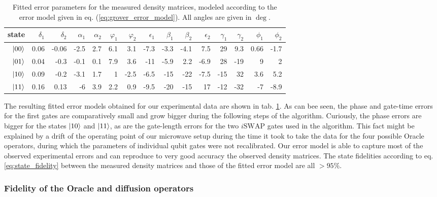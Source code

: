 \begin{table}[ht!]
\centering
\footnotesize{
\begin{tabular}{r|rrrrrrrrrrrrrr}
state & $\delta_1$ & $\delta_2$ & $\alpha_1$ & $\alpha_2$ & $\varphi_1$ & $\varphi_2$ & $\epsilon_1$ & $\beta_1$ & $\beta_2$ & $\epsilon_2$ & $\gamma_1$ & $\gamma_2$ & $\phi_1$ & $\phi_2$ \\ \hline
$\left| 00 \right>$ & 0.06 & -0.06 & -2.5 & 2.7 & 6.1 & 3.1 & -7.3 & -3.3 & -4.1 & 7.5 & 29 & 9.3 & 0.66 & -1.7
 \\
$\left| 01 \right>$ & 0.04 & -0.3 & -0.1 & 0.1 & 7.9 & 3.6 & -11 & -5.9 & 2.2 & -6.9 & 28 & -19 &  9 &  2
 \\
$\left| 10 \right>$ & 0.09 & -0.2 & -3.1 & 1.7 &  1 & -2.5 & -6.5 & -15 & -22 & -7.5 & -15 & 32 & 3.6 & 5.2
\\
$\left| 11 \right>$ & 0.16 & 0.13 & -6 & 3.9 & 2.2 & 0.9 & -9.5 & -20 & -15 & 17 & -12 & -32 & -7 & -8.9
\end{tabular}
}
\caption[Fitted gate error parameters of the Grover algorithm]{Fitted error parameters for the measured density matrices, modeled according to the error model given in eq. (\ref{eq:grover_error_model}). All angles are given in $\deg$.}
\label{tab:grover_error_parameters}
\end{table}

The resulting fitted error models obtained for our experimental data are shown in tab. \ref{tab:grover_error_parameters}. As can bee seen, the phase and gate-time errors for the first gates are comparatively small and grow bigger during the following steps of the algorithm. Curiously, the phase errors are bigger for the states $\left| 10 \right>$ and $\left| 11 \right>$, as are the gate-length errors for the two $i\mathrm{SWAP}$ gates used in the algorithm. This fact might be explained by a drift of the operating point of our microwave setup during the time it took to take the data for the four possible Oracle operators, during which the parameters of individual qubit gates were not recalibrated. Our error model is able to capture most of the observed experimental errors and can reproduce to very good accuracy the observed density matrices. The state fidelities according to eq. \ref{eq:state_fidelity} between the measured density matrices and those of the fitted error model are all $>95\%$.

\subsubsection{Fidelity of the Oracle and diffusion operators}

